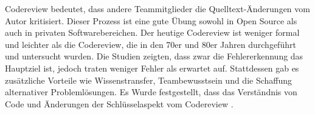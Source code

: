 
Codereview bedeutet, dass andere Teammitglieder die Quelltext-Änderungen vom Autor kritisiert. Dieser Prozess ist eine gute Übung sowohl in Open Source als auch in privaten Softwarebereichen.
Der heutige Codereview ist weniger formal und leichter als die Codereview, die in den 70er und 80er Jahren durchgeführt und untersucht wurden. Die Studien zeigten, dass zwar die Fehlererkennung das Hauptziel ist, jedoch traten weniger Fehler als erwartet auf. Stattdessen gab es zusätzliche Vorteile wie Wissenstransfer, Teambewusstsein und die Schaffung alternativer Problemlösungen. Es Wurde festgestellt, dass das Verständnis von Code und Änderungen der Schlüsselaspekt vom Codereview \cite{bacchelli2013expectations}.


